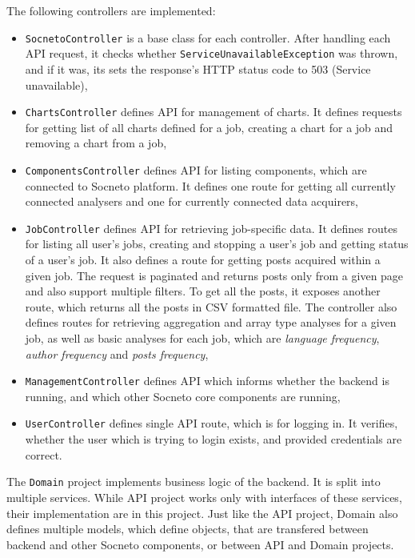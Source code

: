 The following controllers are implemented:
\begin{itemize}
    \item \texttt{SocnetoController} is a base class for each controller. After handling each API request, it checks whether \texttt{ServiceUnavailableException} was thrown, and if it was, its sets the response's HTTP status code to 503 (Service unavailable),
    
    \item \texttt{ChartsController} defines API for management of charts. It defines requests for getting list of all charts defined for a job, creating a chart for a job and removing a chart from a job,
    
    \item \texttt{ComponentsController} defines API for listing components, which are connected to Socneto platform. It defines one route for getting all currently connected analysers and one for currently connected data acquirers,
    
    \item \texttt{JobController} defines API for retrieving job-specific data. It defines routes for listing all user's jobs, creating and stopping a user's job and getting status of a user's job. It also defines a route for getting posts acquired within a given job. The request is paginated and returns posts only from a given page and also support multiple filters. To get all the posts, it exposes another route, which returns all the posts in CSV formatted file. The controller also defines routes for retrieving aggregation and array type analyses for a given job, as well as basic analyses for each job, which are \textit{language frequency}, \textit{author frequency} and \textit{posts frequency},
    
    \item \texttt{ManagementController} defines API which informs whether the backend is running, and which other Socneto core components are running,
    
    \item \texttt{UserController} defines single API route, which is for logging in. It verifies, whether the user which is trying to login exists, and provided credentials are correct. 
\end{itemize}

The \texttt{Domain} project implements business logic of the backend. It is split into multiple services. While API project works only with interfaces of these services, their implementation are in this project. Just like the API project, Domain also defines multiple models, which define objects, that are transfered between backend and other Socneto components, or between API and Domain projects. 

